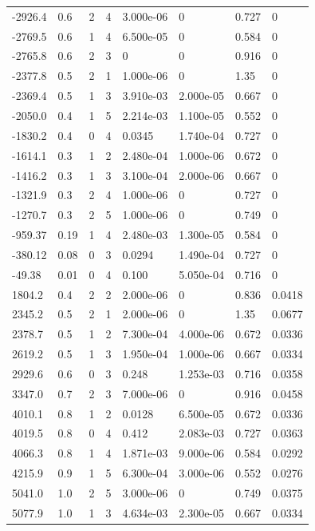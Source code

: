 \documentclass[preview]{standalone}
\begin{document}
{{\begin{tabular}{L{1.2cm}C{1.2cm} C{0.3cm}C{0.5cm} C{1.4cm}C{1.4cm} C{1.4cm}C{1.4cm}}
  -2926.4  &   0.6  & 2     &  4 &  3.000e-06  & 0  & 0.727 &  0   \\ 
  -2769.5  &   0.6  & 1     &  4 &  6.500e-05  & 0  & 0.584 &  0   \\ 
  -2765.8  &   0.6  & 2     &  3 &  0  & 0  & 0.916 &  0   \\ 
  -2377.8  &   0.5  & 2     &  1 &  1.000e-06  & 0  & 1.35 &  0   \\ 
  -2369.4  &   0.5  & 1     &  3 &  3.910e-03  & 2.000e-05  & 0.667 &  0   \\ 
  -2050.0  &   0.4  & 1     &  5 &  2.214e-03  & 1.100e-05  & 0.552 &  0   \\ 
  -1830.2  &   0.4  & 0     &  4 &  0.0345  & 1.740e-04  & 0.727 &  0   \\ 
  -1614.1  &   0.3  & 1     &  2 &  2.480e-04  & 1.000e-06  & 0.672 &  0   \\ 
  -1416.2  &   0.3  & 1     &  3 &  3.100e-04  & 2.000e-06  & 0.667 &  0   \\ 
  -1321.9  &   0.3  & 2     &  4 &  1.000e-06  & 0  & 0.727 &  0   \\ 
  -1270.7  &   0.3  & 2     &  5 &  1.000e-06  & 0  & 0.749 &  0   \\ 
  -959.37  &  0.19  & 1     &  4 &  2.480e-03  & 1.300e-05  & 0.584 &  0   \\ 
  -380.12  &  0.08  & 0     &  3 &  0.0294  & 1.490e-04  & 0.727 &  0   \\ 
  -49.38  &  0.01  & 0     &  4 &  0.100  & 5.050e-04  & 0.716 &  0   \\ 
  1804.2  &   0.4  & 2     &  2 &  2.000e-06  & 0  & 0.836 &  0.0418   \\ 
  2345.2  &   0.5  & 2     &  1 &  2.000e-06  & 0  & 1.35 &  0.0677   \\ 
  2378.7  &   0.5  & 1     &  2 &  7.300e-04  & 4.000e-06  & 0.672 &  0.0336   \\ 
  2619.2  &   0.5  & 1     &  3 &  1.950e-04  & 1.000e-06  & 0.667 &  0.0334   \\ 
  2929.6  &   0.6  & 0     &  3 &  0.248  & 1.253e-03  & 0.716 &  0.0358   \\ 
  3347.0  &   0.7  & 2     &  3 &  7.000e-06  & 0  & 0.916 &  0.0458   \\ 
  4010.1  &   0.8  & 1     &  2 &  0.0128  & 6.500e-05  & 0.672 &  0.0336   \\ 
  4019.5  &   0.8  & 0     &  4 &  0.412  & 2.083e-03  & 0.727 &  0.0363   \\ 
  4066.3  &   0.8  & 1     &  4 &  1.871e-03  & 9.000e-06  & 0.584 &  0.0292   \\ 
  4215.9  &   0.9  & 1     &  5 &  6.300e-04  & 3.000e-06  & 0.552 &  0.0276   \\ 
  5041.0  &   1.0  & 2     &  5 &  3.000e-06  & 0  & 0.749 &  0.0375   \\ 
  5077.9  &   1.0  & 1     &  3 &  4.634e-03  & 2.300e-05  & 0.667 &  0.0334   \\ 
\hline 
\end{tabular} 

}}
\end{document}
